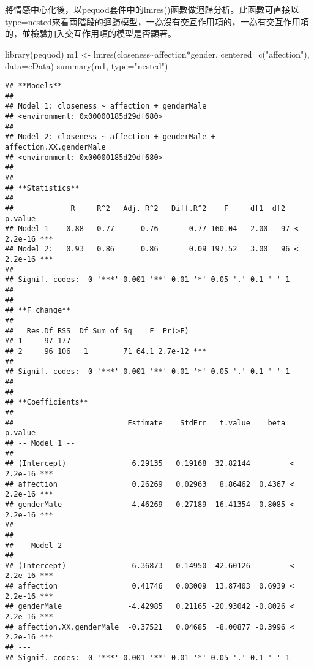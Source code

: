 \documentclass[
]{book}
\newenvironment{Shaded}{\begin{snugshade}}{\end{snugshade}}
\newcommand{\AttributeTok}[1]{\textcolor[rgb]{0.77,0.63,0.00}{#1}}
\newcommand{\FunctionTok}[1]{\textcolor[rgb]{0.00,0.00,0.00}{#1}}
\newcommand{\NormalTok}[1]{#1}
\newcommand{\OtherTok}[1]{\textcolor[rgb]{0.56,0.35,0.01}{#1}}
\newcommand{\SpecialCharTok}[1]{\textcolor[rgb]{0.00,0.00,0.00}{#1}}
\newcommand{\StringTok}[1]{\textcolor[rgb]{0.31,0.60,0.02}{#1}}
\begin{document}
將情感中心化後，以pequod套件中的lmres()函數做迴歸分析。此函數可直接以type=nested來看兩階段的迴歸模型，一為沒有交互作用項的，一為有交互作用項的，並檢驗加入交互作用項的模型是否顯著。

\begin{Shaded}
\begin{Highlighting}[]
\FunctionTok{library}\NormalTok{(pequod)}
\NormalTok{m1 }\OtherTok{\textless{}{-}} \FunctionTok{lmres}\NormalTok{(closeness}\SpecialCharTok{\textasciitilde{}}\NormalTok{affection}\SpecialCharTok{*}\NormalTok{gender, }\AttributeTok{centered=}\FunctionTok{c}\NormalTok{(}\StringTok{"affection"}\NormalTok{), }\AttributeTok{data=}\NormalTok{cData)}
\FunctionTok{summary}\NormalTok{(m1, }\AttributeTok{type=}\StringTok{"nested"}\NormalTok{)}
\end{Highlighting}
\end{Shaded}

\begin{verbatim}
## **Models**
## 
## Model 1: closeness ~ affection + genderMale
## <environment: 0x00000185d29df680>
## 
## Model 2: closeness ~ affection + genderMale + affection.XX.genderMale
## <environment: 0x00000185d29df680>
## 
## 
## **Statistics**
## 
##             R     R^2   Adj. R^2   Diff.R^2    F     df1  df2    p.value    
## Model 1    0.88   0.77      0.76       0.77 160.04   2.00   97 < 2.2e-16 ***
## Model 2:   0.93   0.86      0.86       0.09 197.52   3.00   96 < 2.2e-16 ***
## ---
## Signif. codes:  0 '***' 0.001 '**' 0.01 '*' 0.05 '.' 0.1 ' ' 1
## 
## 
## **F change**
## 
##   Res.Df RSS  Df Sum of Sq    F  Pr(>F)    
## 1     97 177                               
## 2     96 106   1        71 64.1 2.7e-12 ***
## ---
## Signif. codes:  0 '***' 0.001 '**' 0.01 '*' 0.05 '.' 0.1 ' ' 1
## 
## 
## **Coefficients**
## 
##                          Estimate    StdErr   t.value    beta   p.value    
## -- Model 1 --                                                              
##                                                                            
## (Intercept)               6.29135   0.19168  32.82144         < 2.2e-16 ***
## affection                 0.26269   0.02963   8.86462  0.4367 < 2.2e-16 ***
## genderMale               -4.46269   0.27189 -16.41354 -0.8085 < 2.2e-16 ***
##                                                                            
##                                                                            
## -- Model 2 --                                                              
##                                                                            
## (Intercept)               6.36873   0.14950  42.60126         < 2.2e-16 ***
## affection                 0.41746   0.03009  13.87403  0.6939 < 2.2e-16 ***
## genderMale               -4.42985   0.21165 -20.93042 -0.8026 < 2.2e-16 ***
## affection.XX.genderMale  -0.37521   0.04685  -8.00877 -0.3996 < 2.2e-16 ***
## ---
## Signif. codes:  0 '***' 0.001 '**' 0.01 '*' 0.05 '.' 0.1 ' ' 1
\end{verbatim}
\end{document}
